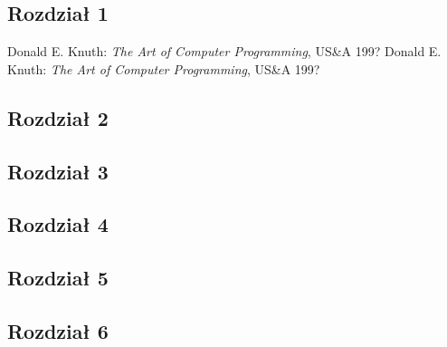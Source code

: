 \begin{thebibliography}{mmi}
\subsection*[]{Rozdział 1}
 Donald E. Knuth: \emph{The Art of Computer Programming}, US\&A 199?
 Donald E. Knuth: \emph{The Art of Computer Programming}, US\&A 199?
\subsection*[]{Rozdział 2}
\subsection*[]{Rozdział 3}
\subsection*[]{Rozdział 4}
\subsection*[]{Rozdział 5}
\subsection*[]{Rozdział 6}
\end{thebibliography}
